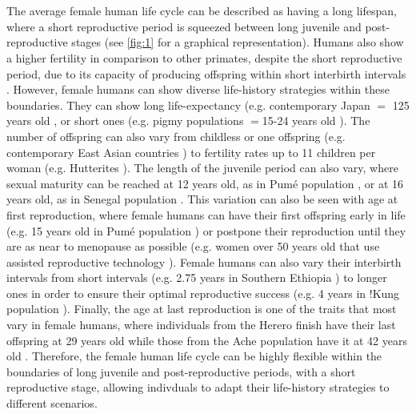 \documentclass{article}
\begin{document}
\\\\
The average female human life cycle can be described as having a long lifespan, where a short reproductive period is squeezed between long juvenile and post-reproductive stages (see \ref{fig:1} for a graphical representation). Humans also show a higher fertility in comparison to other primates, despite the short reproductive period, due to its capacity of producing offspring within short interbirth intervals \citep{kaplan2000theory}. However, female humans can show diverse life-history strategies within these boundaries. They can show long life-expectancy (e.g. contemporary Japan $=$ 125 years old \citep{de2017maximum}, or short ones (e.g. pigmy populations $=$15-24 years old \citep{migliano2007life}). The number of offspring can also vary from childless or one offspring (e.g. contemporary East Asian countries \citep{jones2019ultra}) to fertility rates up to 11 children per woman (e.g. Hutterites \citep{eaton1953social}). The length of the juvenile period can also vary, where sexual maturity can be reached at 12 years old, as in Pumé population \citep{kramer2008early}, or at 16 years old, as in Senegal population \citep{simondon1997nutritional}. This variation can also be seen with age at first reproduction, where female humans can have their first offspring early in life (e.g. 15 years old in Pumé population \citep{kramer2008early}) or postpone their reproduction until they are as near to menopause as possible (e.g. women over 50 years old that use assisted reproductive technology \citep{salihu2003childbearing}). Female humans can also vary their interbirth intervals from short intervals (e.g. 2.75 years in Southern Ethiopia \citep{yohannes2011duration}) to longer ones in order to ensure their optimal reproductive success (e.g. 4 years in !Kung population \citep{jones1986bushman}). Finally, the age at last reproduction is one of the traits that most vary in female humans, where individuals from the Herero finish have their last offspring at 29 years old while those from the Ache population have it at 42 years old \citep{towner2016women}. Therefore, the female human life cycle can be highly flexible within the boundaries of long juvenile and post-reproductive periods, with a short reproductive stage, allowing indivduals to adapt their life-history strategies to different scenarios.
\\\\
\end{document}
